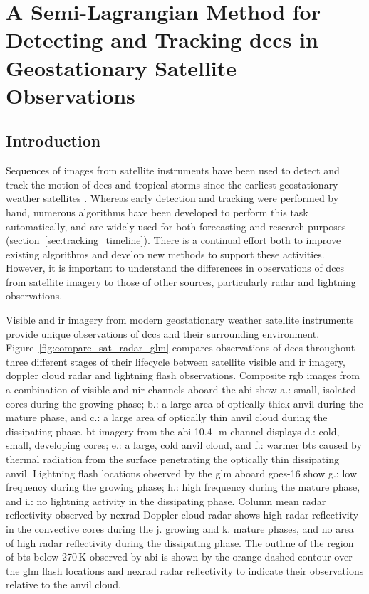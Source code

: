 \chapter{A Semi-Lagrangian Method for Detecting and Tracking \acrshort{dcc}s in Geostationary Satellite Observations} \label{chp:tracking_method}


\section{Introduction} %


Sequences of images from satellite instruments have been used to detect and track the motion of \acrshort{dcc}s and tropical storms since the earliest geostationary weather satellites \citep{menzel_cloud_2001}.
Whereas early detection and tracking were performed by hand, numerous algorithms have been developed to perform this task automatically, and are widely used for both forecasting and research purposes (section~\ref{sec:tracking_timeline}).
There is a continual effort both to improve existing algorithms and develop new methods to support these activities.
However, it is important to understand the differences in observations of \acrshort{dcc}s from satellite imagery to those of other sources, particularly radar and lightning observations.

Visible and \acrshort{ir} imagery from modern geostationary weather satellite instruments provide unique observations of \acrshort{dcc}s and their surrounding environment.
Figure~\ref{fig:compare_sat_radar_glm} compares observations of \acrshort{dcc}s throughout three different stages of their lifecycle between satellite visible and \acrshort{ir} imagery, doppler cloud radar and lightning flash observations.
Composite \acrfull{rgb} images from a combination of visible and \acrshort{nir} channels aboard the \acrshort{abi} show a.: small, isolated cores during the growing phase; b.: a large area of optically thick anvil during the mature phase, and c.: a large area of optically thin anvil cloud during the dissipating phase.
\acrshort{bt} imagery from the \acrshort{abi} 10.4\,\unit{\mu m} channel displays d.: cold, small, developing cores; e.: a large, cold anvil cloud, and f.: warmer \acrshort{bt}s caused by thermal radiation from the surface penetrating the optically thin dissipating anvil. 
Lightning flash locations observed by the \acrfull{glm} aboard \acrshort{goes}-16 show g.: low frequency during the growing phase; h.: high frequency during the mature phase, and i.: no lightning activity in the dissipating phase. 
Column mean radar reflectivity observed by \acrfull{nexrad} Doppler cloud radar shows high radar reflectivity in the convective cores during the j. growing and k. mature phases, and no area of high radar reflectivity during the dissipating phase. 
The outline of the region of \acrshort{bt}s below 270\,\unit{K} observed by \acrshort{abi} is shown by the orange dashed contour over the \acrshort{glm} flash locations and \acrshort{nexrad} radar reflectivity to indicate their observations relative to the anvil cloud.


